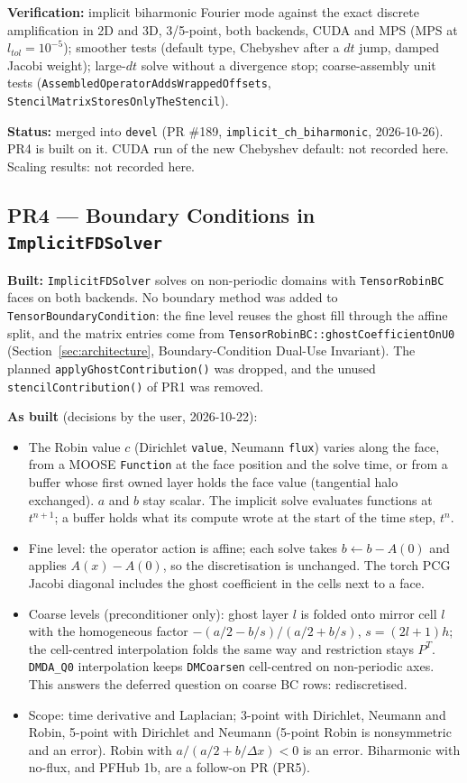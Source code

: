 \documentclass[11pt]{article}
\newcommand{\pr}[2]{\subsection{PR#1 --- #2}}
\newcommand{\status}[1]{\textcolor{marlinteal}{\textbf{Status:}} #1}
\begin{document}
\textbf{Verification:} implicit biharmonic Fourier mode against the exact
discrete amplification in 2D and 3D, 3/5-point, both backends, CUDA and MPS
(MPS at $l_{tol}=10^{-5}$); smoother tests (default type, Chebyshev after a
$dt$ jump, damped Jacobi weight); large-$dt$ solve without a divergence stop;
coarse-assembly unit
tests (\texttt{AssembledOperatorAddsWrappedOffsets},
\texttt{StencilMatrixStoresOnlyTheStencil}).

\status{merged into \texttt{devel} (PR \#189, \texttt{implicit\_ch\_biharmonic},
2026-10-26). PR4 is built on it. CUDA run of the new Chebyshev default: not recorded here. Scaling results:
not recorded here.}

\pr{4}{Boundary Conditions in \texttt{ImplicitFDSolver}}
\textbf{Built:} \texttt{ImplicitFDSolver} solves on non-periodic domains with
\texttt{TensorRobinBC} faces on both backends. No boundary method was added
to \texttt{TensorBoundaryCondition}: the fine level reuses the ghost fill
through the affine split, and the matrix entries come from
\texttt{TensorRobinBC::ghostCoefficientOnU0}
(Section~\ref{sec:architecture}, Boundary-Condition Dual-Use Invariant).
The planned \texttt{applyGhostContribution()} was dropped, and the unused
\texttt{stencilContribution()} of PR1 was removed.

\textbf{As built} (decisions by the user, 2026-10-22):
\begin{itemize}[leftmargin=*]
\item The Robin value $c$ (Dirichlet \texttt{value}, Neumann \texttt{flux}) varies along the
face, from a MOOSE \texttt{Function} at the face position and the solve time, or from a
buffer whose first owned layer holds the face value (tangential halo exchanged). $a$ and
$b$ stay scalar. The implicit solve evaluates functions at $t^{n+1}$; a buffer holds what its compute wrote at the start of the time step, $t^n$.
\item Fine level: the operator action is affine; each solve takes $b \leftarrow b - A(0)$
and applies $A(x) - A(0)$, so the discretisation is unchanged. The torch PCG Jacobi
diagonal includes the ghost coefficient in the cells next to a face.
\item Coarse levels (preconditioner only): ghost layer $l$ is folded onto mirror cell $l$
with the homogeneous factor $-(a/2 - b/s)/(a/2 + b/s)$, $s = (2l+1)h$; the cell-centred
interpolation folds the same way and restriction stays $P^T$. \texttt{DMDA\_Q0}
interpolation keeps \texttt{DMCoarsen} cell-centred on non-periodic axes. This answers the
deferred question on coarse BC rows: rediscretised.
\item Scope: time derivative and Laplacian; 3-point with Dirichlet, Neumann and Robin,
5-point with Dirichlet and Neumann (5-point Robin is nonsymmetric and an error). Robin
with $a/(a/2 + b/\Delta x) < 0$ is an error. Biharmonic with no-flux, and PFHub 1b, are a
follow-on PR (PR5).
\end{itemize}
\end{document}
